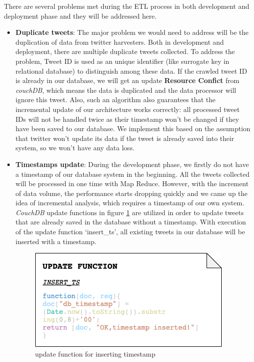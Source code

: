 \documentclass{article}
\begin{document}
There are several problems met during the ETL process in both development and deployment phase and they will be addressed here.
\begin{itemize}
    \item \textbf{Duplicate tweets}: The major problem we would need to address will be the duplication of data from twitter harvesters. Both in development and deployment, there are multiple duplicate tweets collected. To address the problem, Tweet ID is used as an unique identifier (like surrogate key in relational database) to distinguish among these data. If the crawled tweet ID is already in our database, we will get an update \textbf{Resource Confict} from \textit{couchDB}, which means the data is duplicated and the data processor will ignore this tweet. Also, such an algorithm also guarantees that the incremental update of our architecture works correctly: all processed tweet IDs will not be handled twice as their timestamp won’t be changed if they have been saved to our database. We implement this based on the assumption that twitter won’t update its data if the tweet is already saved into their system, so we won’t have any data loss.

    \item \textbf{Timestamps update}: During the development phase, we firstly do not have a timestamp of our database system in the beginning. All the tweets collected will be processed in one time with Map Reduce. However, with the increment of data volume, the performance starts dropping quickly and we came up the idea of incremental analysis, which requires a timestamp of our own system. \textit{CouchDB} update functions in figure \ref{fig:insertts} are utilized in order to update tweets that are already saved in the database without a timestamp. With execution of the update function ‘insert\_ts’, all existing tweets in our database will be inserted with a timestamp.
\begin{figure}
\centering
\includegraphics{img/insert_ts.png}
\caption{update function for inserting timestamp}
\label{fig:insertts}
\end{figure}
\end{itemize}
\end{document}
